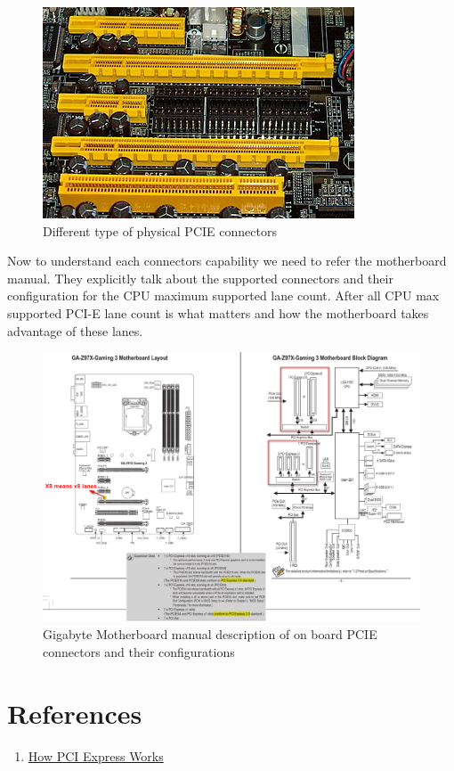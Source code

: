 \documentclass{article}
\begin{document}
\begin{figure}[H]
\centering
\includegraphics[width=\textwidth]{350px-PCIExpress.png}
\caption{Different type of physical PCIE connectors}
\end{figure}

Now to understand each connectors capability we need to refer the
motherboard manual. They explicitly talk about the supported
connectors and their configuration for the CPU maximum
supported lane count. After all CPU max supported PCI-E lane count
is what matters and how the motherboard takes advantage of these lanes.

\begin{figure}[H]
\centering
\includegraphics[width=\textwidth]{Motherboard-Manual.png}
\caption{Gigabyte Motherboard manual description of on board PCIE connectors and their configurations}
\end{figure}


\section{References}
\begin{enumerate}[noitemsep]
\item \href{https://computer.howstuffworks.com/pci-express.htm}{How PCI Express Works}
\end{enumerate}
\end{document}
